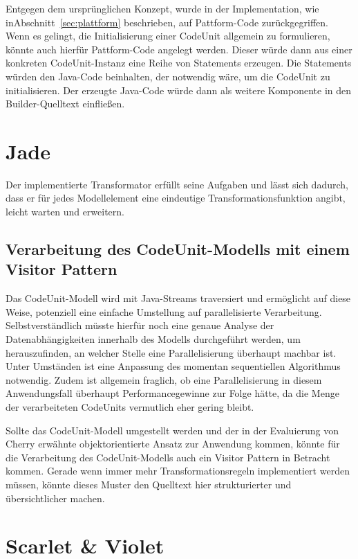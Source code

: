 \documentclass[12pt,oneside,a4paper,parskip]{scrbook}
\begin{document}
Entgegen dem ursprünglichen Konzept, wurde in der Implementation, wie in\linebreak Abschnitt~\ref{sec:plattform} beschrieben, auf Pattform-Code zurückgegriffen. Wenn es gelingt, die Initialisierung einer CodeUnit allgemein zu formulieren, könnte auch hierfür Pattform-Code angelegt werden. Dieser würde dann aus einer konkreten CodeUnit-Instanz eine Reihe von Statements erzeugen. Die Statements würden den Java-Code beinhalten, der notwendig wäre, um die CodeUnit zu initialisieren. Der erzeugte Java-Code würde dann als weitere Komponente in den Builder-Quelltext einfließen.

\section{Jade}

Der implementierte Transformator erfüllt seine Aufgaben und lässt sich dadurch, dass er für jedes Modellelement eine eindeutige Transformationsfunktion angibt, leicht warten und erweitern.

\subsection{Verarbeitung des CodeUnit-Modells mit einem Visitor Pattern}

Das CodeUnit-Modell wird mit Java-Streams traversiert und ermöglicht auf diese Weise, potenziell eine einfache Umstellung auf parallelisierte Verarbeitung. Selbstverständlich müsste hierfür noch eine genaue Analyse der Datenabhängigkeiten innerhalb des Modells durchgeführt werden, um herauszufinden, an welcher Stelle eine Parallelisierung überhaupt machbar ist. Unter Umständen ist eine Anpassung des momentan sequentiellen Algorithmus notwendig. Zudem ist allgemein fraglich, ob eine Parallelisierung in diesem Anwendungsfall überhaupt Performancegewinne zur Folge hätte, da die Menge der verarbeiteten CodeUnits vermutlich eher gering bleibt.

Sollte das CodeUnit-Modell umgestellt werden und der in der Evaluierung von Cherry erwähnte objektorientierte Ansatz zur Anwendung kommen, könnte für die Verarbeitung des CodeUnit-Modells auch ein Visitor Pattern in Betracht kommen. Gerade wenn immer mehr Transformationsregeln implementiert werden müssen, könnte dieses Muster den Quelltext hier strukturierter und übersichtlicher machen.

\section{Scarlet \& Violet}
\end{document}

